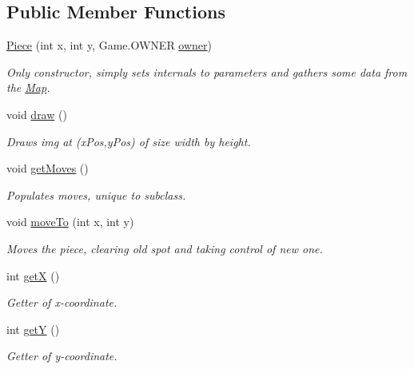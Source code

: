 \subsection*{Public Member Functions}
\begin{DoxyCompactItemize}
\item 
\hyperlink{classapplication_1_1_piece_a7845605267af2d616efc66af07d175ea}{Piece} (int x, int y, Game.\+O\+W\+N\+E\+R \hyperlink{classapplication_1_1_piece_a724f116bd99a66a6f6bcc8b7b35de131}{owner})
\begin{DoxyCompactList}\small\item\em Only constructor, simply sets internals to parameters and gathers some data from the \hyperlink{classapplication_1_1_map}{Map}. \end{DoxyCompactList}\item 
\hypertarget{classapplication_1_1_piece_ae4bdd8cfc85f889c8d7dc840a137cd65}{void \hyperlink{classapplication_1_1_piece_ae4bdd8cfc85f889c8d7dc840a137cd65}{draw} ()}\label{classapplication_1_1_piece_ae4bdd8cfc85f889c8d7dc840a137cd65}

\begin{DoxyCompactList}\small\item\em Draws img at (x\+Pos,y\+Pos) of size width by height. \end{DoxyCompactList}\item 
\hypertarget{classapplication_1_1_piece_acca039f617b0bf259eb1e1d00fbf4cda}{void \hyperlink{classapplication_1_1_piece_acca039f617b0bf259eb1e1d00fbf4cda}{get\+Moves} ()}\label{classapplication_1_1_piece_acca039f617b0bf259eb1e1d00fbf4cda}

\begin{DoxyCompactList}\small\item\em Populates moves, unique to subclass. \end{DoxyCompactList}\item 
void \hyperlink{classapplication_1_1_piece_ac91b28148a2b0e38edeba7a42501d99f}{move\+To} (int x, int y)
\begin{DoxyCompactList}\small\item\em Moves the piece, clearing old spot and taking control of new one. \end{DoxyCompactList}\item 
int \hyperlink{classapplication_1_1_piece_a2e58a2e63e94dd3de909e2fd55a7b819}{get\+X} ()
\begin{DoxyCompactList}\small\item\em Getter of x-\/coordinate. \end{DoxyCompactList}\item 
int \hyperlink{classapplication_1_1_piece_a360e6e106c1254e4b86e69143ca0ce72}{get\+Y} ()
\begin{DoxyCompactList}\small\item\em Getter of y-\/coordinate. \end{DoxyCompactList}\end{DoxyCompactItemize}

